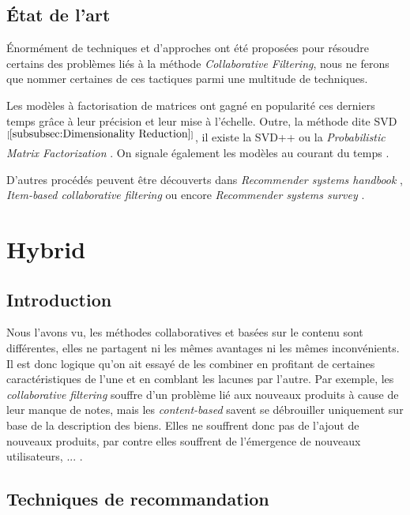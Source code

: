 \subsection{État de l'art}

Énormément de techniques et d'approches ont été proposées pour résoudre certains des problèmes liés à la méthode \textit{Collaborative Filtering}, nous ne ferons que nommer certaines de ces tactiques parmi une multitude de techniques.

Les modèles à factorisation de matrices ont gagné en popularité ces derniers temps grâce à leur précision et leur mise à l'échelle. Outre, la méthode dite SVD$^{[\ref{subsubsec:Dimensionality Reduction}]}$, il existe la SVD++ ou la \textit{Probabilistic Matrix Factorization} \cite{koren2009matrix}. On signale également les modèles au courant du temps \cite{koren2010collaborative}.

D'autres procédés peuvent être découverts dans \textit{Recommender systems handbook} \cite{Ricci210}, \textit{Item-based collaborative filtering} \cite{sarwar2001item} ou encore \textit{Recommender systems survey} \cite{bobadilla2013recommender}.

\section{Hybrid}

\subsection{Introduction}

Nous l'avons vu, les méthodes collaboratives et basées sur le contenu sont différentes, elles ne partagent ni les mêmes avantages ni les mêmes inconvénients. Il est donc logique qu'on ait essayé de les combiner en profitant de certaines caractéristiques de l'une et en comblant les lacunes par l'autre. Par exemple, les \textit{collaborative filtering} souffre d'un problème lié aux nouveaux produits à cause de leur manque de notes, mais les \textit{content-based} savent se débrouiller uniquement sur base de la description des biens. Elles ne souffrent donc pas de l'ajout de nouveaux produits, par contre elles souffrent de l'émergence de nouveaux utilisateurs, ... \cite{burke2007hybrid}.

\subsection{Techniques de recommandation}

